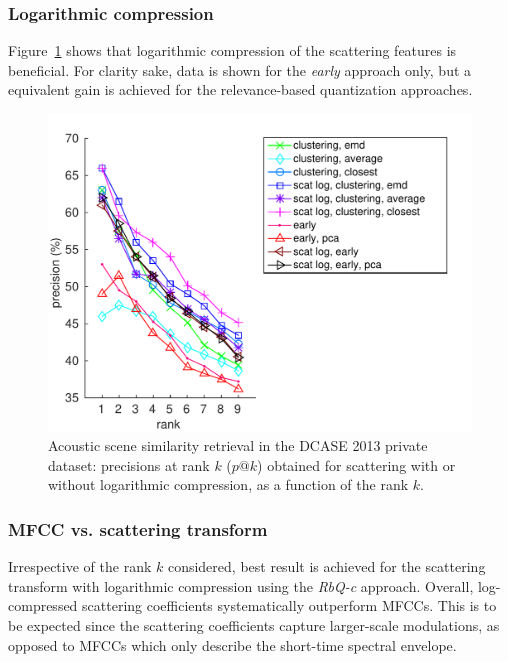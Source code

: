 \documentclass[smallextended]{svjour3}
\makeatletter
\newcommand*{\vs}{vs.\@\xspace}
\newcommand{\ja}[1]{\textcolor{magenta}{Joakim : #1}}
\makeatother
\begin{document}
\subsubsection*{Logarithmic compression}

Figure~\ref{fig:ASS_0} shows that logarithmic compression of the scattering features is beneficial. For clarity sake, data is shown  for the \emph{early} approach only, but a equivalent gain is achieved for the relevance-based quantization approaches. %

\begin{figure}[t]
\begin{center}
\includegraphics[width=\columnwidth]{figures/log}
\caption{Acoustic scene similarity retrieval in the DCASE 2013 private dataset: precisions at rank $k$ ($p@k$) obtained for scattering with or without logarithmic compression, as a function of the rank $k$.}
\label{fig:ASS_0}
\end{center}
\end{figure}

\subsubsection*{MFCC \vs scattering transform}

Irrespective of the rank $k$ considered, best result is achieved for the scattering transform with logarithmic compression using the \emph{RbQ-c} approach. Overall, log-compressed scattering coefficients systematically outperform MFCCs. This is to be expected since the scattering coefficients capture larger-scale modulations, as opposed to MFCCs which only describe the short-time spectral envelope.
\end{document}
